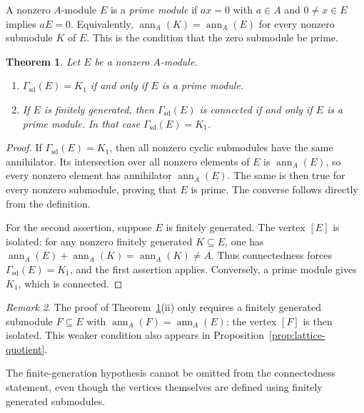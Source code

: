 \documentclass[11pt]{amsart}
\theoremstyle{plain}
\newtheorem{theorem}{Theorem}[section]
\theoremstyle{definition}
\theoremstyle{remark}
\newtheorem{remark}[theorem]{Remark}
\newcommand{\ann}{\operatorname{ann}}
\newcommand{\GammaSD}{\Gamma_{\mathrm{sd}}}
\numberwithin{equation}{section}
\begin{document}
A nonzero $A$-module $E$ is a \emph{prime module} if
$ax=0$ with $a\in A$ and $0\ne x\in E$ implies $aE=0$.
Equivalently, $\ann_A(K)=\ann_A(E)$ for every nonzero submodule $K$ of $E$.
This is the condition that the zero submodule be prime.

\begin{theorem}\label{thm:graph-prime}\label{thm1}
Let $E$ be a nonzero $A$-module.
\begin{enumerate}[label=\textup{(\roman*)}]
\item $\GammaSD(E)=K_1$ if and only if $E$ is a prime module.
\item If $E$ is finitely generated, then $\GammaSD(E)$ is connected if and
only if $E$ is a prime module. In that case $\GammaSD(E)=K_1$.
\end{enumerate}
\end{theorem}

\begin{proof}
If $\GammaSD(E)=K_1$, then all nonzero cyclic submodules have the same
annihilator. Its intersection over all nonzero elements of $E$ is
$\ann_A(E)$, so every nonzero element has annihilator $\ann_A(E)$.
The same is then true for every nonzero submodule, proving that $E$ is prime.
The converse follows directly from the definition.

For the second assertion, suppose $E$ is finitely generated.
The vertex $[E]$ is isolated: for any nonzero finitely generated
$K\subseteq E$, one has
$\ann_A(E)+\ann_A(K)=\ann_A(K)\ne A$.
Thus connectedness forces $\GammaSD(E)=K_1$, and the first assertion applies.
Conversely, a prime module gives $K_1$, which is connected.
\end{proof}

\begin{remark}\label{rem:finite-annihilator-detection}
The proof of Theorem~\ref{thm:graph-prime}(ii) only requires a finitely
generated submodule $F\subseteq E$ with $\ann_A(F)=\ann_A(E)$:
the vertex $[F]$ is then isolated. This weaker condition also appears in
Proposition~\ref{prop:lattice-quotient}.
\end{remark}

The finite-generation hypothesis cannot be omitted from the connectedness
statement, even though the vertices themselves are defined using finitely
generated submodules.
\end{document}
